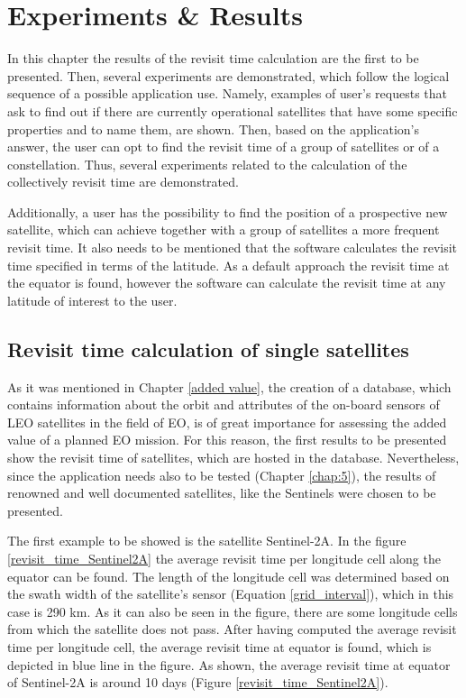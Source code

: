 \chapter{Experiments \& Results}
\label{chap:4}

\bigskip

In this chapter the results of the revisit time calculation are the first to be presented. Then, several experiments are demonstrated, which follow the logical sequence of a possible application use. Namely, examples of user's requests that ask to find out if there are currently operational satellites that have some specific properties and to name them, are shown. Then, based on the application's answer, the user can opt to find the revisit time of a group of satellites or of a constellation. Thus, several experiments related to the calculation of the collectively revisit time are demonstrated.

Additionally, a user has the possibility to find the position of a prospective new satellite, which can achieve together with a group of satellites a more frequent revisit time. It also needs to be mentioned that the software calculates the revisit time specified in terms of the latitude. As a default approach the revisit time at the equator is found, however the software can calculate the revisit time at any latitude of interest to the user.

\bigskip
\section{Revisit time calculation of single satellites}
\bigskip

As it was mentioned in Chapter \ref{added value}, the creation of a database, which contains information about the orbit and attributes of the on-board sensors of LEO satellites in the field of EO, is of great importance for assessing the added value of a planned EO mission. For this reason, the first results to be presented show the revisit time of satellites, which are hosted in the database. Nevertheless, since the application needs also to be tested (Chapter \ref{chap:5}), the results of renowned and well documented satellites, like the Sentinels were chosen to be presented.

The first example to be showed is the satellite Sentinel-2A. In the figure \ref{revisit_time_Sentinel2A} the average revisit time per longitude cell along the equator can be found. The length of the longitude cell was determined based on the swath width of the satellite's sensor (Equation \ref{grid_interval}), which in this case is 290 km. As it can also be seen in the figure, there are some longitude cells from which the satellite does not pass. After having computed the average revisit time per longitude cell, the average revisit time at equator is found, which is depicted in blue line in the figure. As shown, the average revisit time at equator of Sentinel-2A is around 10 days (Figure \ref{revisit_time_Sentinel2A}).

